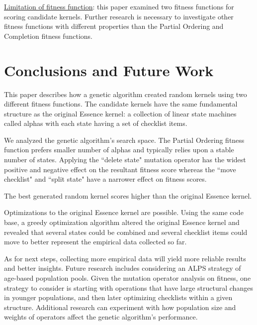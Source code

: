 \documentclass[3p,times,procedia]{elsarticle}
\begin{document}
\underline{Limitation of fitness function}: this paper examined two  fitness functions for scoring candidate kernels. Further research is necessary to investigate other fitness functions with different properties than the Partial Ordering and Completion fitness functions.

\section{Conclusions and Future Work}

This paper describes how a genetic algorithm created random kernels using two different fitness functions. The candidate kernels have the same fundamental structure as the original Essence kernel: a collection of linear state machines called alphas with each state having a set of checklist items. 

We analyzed the genetic algorithm's search space. The Partial Ordering fitness function prefers smaller number of alphas and typically relies upon a stable number of states. Applying the ``delete state" mutation operator has the widest positive and negative effect on the resultant fitness score whereas the ``move checklist" and ``split state" have a narrower effect on fitness scores. 


The best generated random kernel scores higher than the original Essence kernel. 

Optimizations to the original Essence kernel are possible. Using the same code base, a greedy optimization algorithm altered the original Essence kernel and revealed that several states could be combined and several checklist items could move to better represent the empirical data collected so far.

As for next steps, collecting more empirical data will yield more reliable results and better insights. Future research includes considering an ALPS strategy \cite{ALPS} of age-based population pools. 
Given the mutation operator analysis on fitness, one strategy to consider is starting with operations that have large structural changes in younger populations, and then later optimizing checklists within a given structure. Additional research can experiment with how population size and weights of operators affect the genetic algorithm's performance. %
\end{document}
